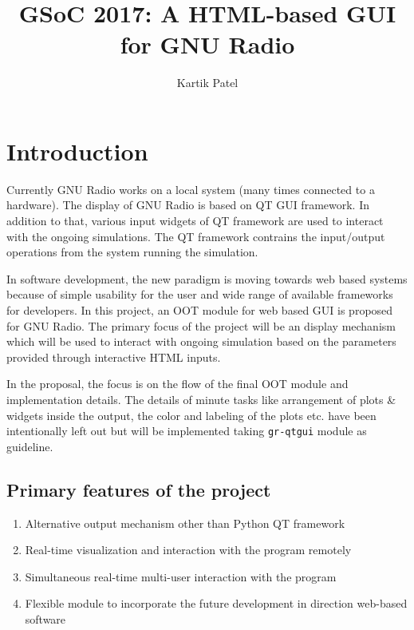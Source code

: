 \documentclass[a4paper, 11pt]{article}
\title{GSoC 2017: A HTML-based GUI for GNU Radio}
\author{Kartik Patel}
\begin{document}
\newcommand{\pull}[1]{\href{https://github.com/gnuradio/gnuradio/pull/#1}{\# #1}}



\maketitle

\section{Introduction}
Currently GNU Radio works on a local system (many times connected to a hardware). The display of GNU Radio is based on QT GUI framework. In addition to that, various input widgets of QT framework are used to interact with the ongoing simulations. The QT framework contrains the input/output operations from the system running the simulation.

In software development, the new paradigm is moving towards web based systems because of simple usability for the user and wide range of available frameworks for developers. In this project, an OOT module for web based GUI is proposed for GNU Radio. The primary focus of the project will be an display mechanism which will be used to interact with ongoing simulation based on the parameters provided through interactive HTML inputs.

In the proposal, the focus is on the flow of the final OOT module and implementation details. The details of minute tasks like arrangement of plots \& widgets inside the output, the color and labeling of the plots etc. have been intentionally left out but will be implemented taking \texttt{gr-qtgui} module as guideline.


\subsection{Primary features of the project}
\begin{enumerate}
\item Alternative output mechanism other than Python QT framework
\item Real-time visualization and interaction with the program remotely
\item Simultaneous real-time multi-user interaction with the program
\item Flexible module to incorporate the future development in direction web-based software
\end{enumerate}
\end{document}
